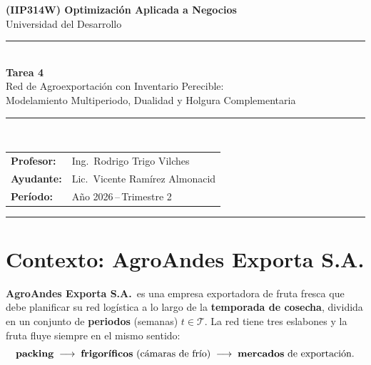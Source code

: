 \documentclass[12pt,a4paper]{article}
\begin{document}

\begin{center}
    {\Large\bfseries\color{uddblue}
     (IIP314W) Optimización Aplicada a Negocios}\\[0.4em]
    {\large Universidad del Desarrollo}\\[0.8em]
    \noindent\rule{\linewidth}{1.5pt}\\[0.5em]
    {\LARGE\bfseries Tarea 4}\\[0.3em]
    {\large Red de Agroexportación con Inventario Perecible:\\
     Modelamiento Multiperiodo, Dualidad y Holgura Complementaria}\\[0.5em]
    \noindent\rule{\linewidth}{1.5pt}\\[0.8em]
    \begin{tabular}{@{}ll@{}}
        \textbf{Profesor:} & Ing.\ Rodrigo Trigo Vilches \\[0.3em]
        \textbf{Ayudante:} & Lic.\ Vicente Ramírez Almonacid \\[0.3em]
        \textbf{Período:}  & Año 2026\,--\,Trimestre 2
    \end{tabular}
\end{center}

\vspace{1em}
\noindent\rule{\linewidth}{0.4pt}
\vspace{0.5em}

\section*{Contexto: AgroAndes Exporta S.A.}

\textbf{AgroAndes Exporta S.A.}\ es una empresa exportadora de fruta fresca que
debe planificar su red logística a lo largo de la \textbf{temporada de cosecha},
dividida en un conjunto de \textbf{periodos} (semanas) $t\in\mathcal{T}$. La red
tiene tres eslabones y la fruta fluye siempre en el mismo sentido:
\[
\text{\textbf{packing}} \;\longrightarrow\;
\text{\textbf{frigoríficos} (cámaras de frío)} \;\longrightarrow\;
\text{\textbf{mercados} de exportación}.
\]
\end{document}
